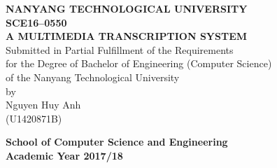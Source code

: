 \begin{titlepage}
\begin{center}

\uppercase{\textbf{Nanyang Technological University}}
\\[5cm]

\uppercase{
    \textbf{SCE16--0550}\\
    \textbf{A Multimedia Transcription System}
}\\[5cm]

Submitted in Partial Fulfillment of the Requirements\\
for the Degree of Bachelor of Engineering (Computer Science)\\
of the Nanyang Technological University\\[1cm]
by\\[1cm]
Nguyen Huy Anh\\
(U1420871B)

\vfill

\textbf{School of Computer Science and Engineering}\\
\textbf{Academic Year 2017/18}

\end{center}
\end{titlepage}
